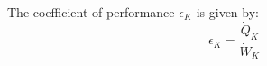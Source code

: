 The coefficient of performance \( \epsilon_K \) is given by:  
\[
\epsilon_K = \frac{\dot{Q}_K}{\dot{W}_K}
\]